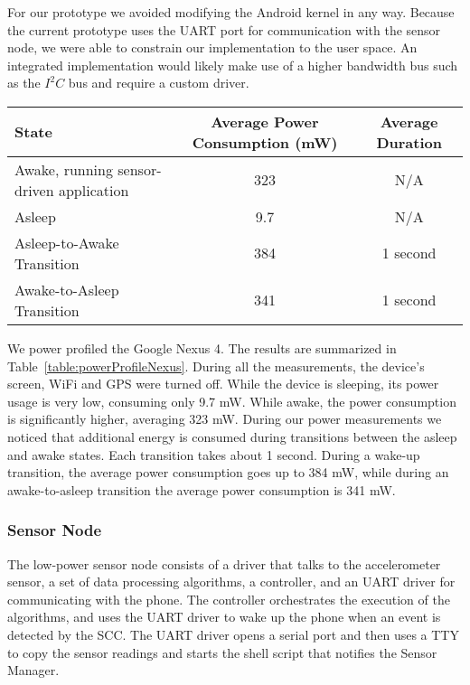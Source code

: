 For our prototype we avoided modifying the Android kernel in any way.
Because the current prototype uses the UART port for communication
with the sensor node, we were able to constrain our implementation to
the user space.  An integrated implementation would likely make use of
a higher bandwidth bus such as the $I^2C$ bus and require a custom
driver.

\bgroup
\def\arraystretch{1.5}
\begin{table*}[t]
\centering
{\small
	\begin{tabular}{| l | c | c |}
		\hline
		\textbf{State}								& \textbf{Average Power Consumption (mW)} 		& \textbf{Average Duration} \\ \hline
		Awake, running sensor-driven application 	& 323 											& N/A \\ \hline
		Asleep 										& 9.7 											& N/A \\ \hline
		Asleep-to-Awake Transition 					& 384 											& 1 second \\ \hline
		Awake-to-Asleep Transition 					& 341 											& 1 second \\ \hline
	\end{tabular}
}
	\caption{Google Nexus 4 power profile.}
	\label{table:powerProfileNexus}
\end{table*}
\egroup

We power profiled the Google Nexus 4.  The results are summarized in
Table~\ref{table:powerProfileNexus}.  During all the measurements, the
device's screen, WiFi and GPS were turned off.  While the device is
sleeping, its power usage is very low, consuming only 9.7 mW.  While
awake, the power consumption is significantly higher, averaging 323
mW.  During our power measurements we noticed that additional energy is
consumed during transitions between the asleep and awake states.  Each
transition takes about 1 second.  During a wake-up transition, the
average power consumption goes up to 384 mW, while during an
awake-to-asleep transition the average power consumption is 341 mW.


\subsubsection{Sensor Node}
\label{subsec:sensorNode}

The low-power sensor node consists of a driver that talks to
the accelerometer sensor, a set of data processing algorithms, a controller,
and an UART driver for communicating with the phone.  The controller
orchestrates the execution of the algorithms, and uses the UART driver to
wake up the phone when an event is detected by the SCC.  The UART driver
opens a serial port and then uses a TTY to copy the sensor readings
and starts the shell script that notifies the Sensor Manager.


